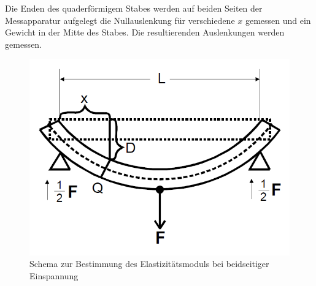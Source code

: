Die Enden des quaderförmigem Stabes werden auf beiden Seiten der Messapparatur aufgelegt die Nullauslenkung für verschiedene $x$ gemessen und ein Gewicht in der Mitte des Stabes.
Die resultierenden Auslenkungen werden gemessen.
\begin{figure}
	\centering
	\includegraphics[scale=.305]{content/images/beidseitig.png}
	\caption{Schema zur Bestimmung des Elastizitätsmoduls bei beidseitiger Einspannung\cite{V103}}
	\label{fig:beidseitig}
\end{figure}